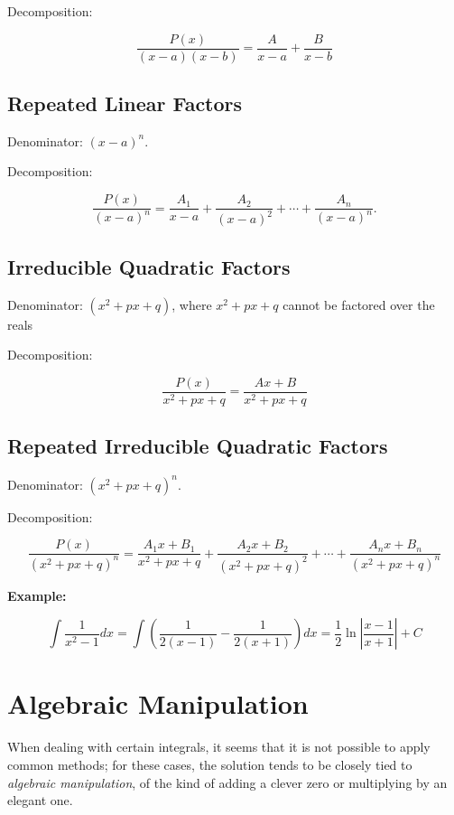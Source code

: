Decomposition: 

\[
    \frac{P(x)}{(x - a)(x - b)} = \frac{A}{x - a} + \frac{B}{x - b}
\]


\subsection{Repeated Linear Factors}
    
Denominator: \((x - a)^n\).

Decomposition: 
   
\[
    \frac{P(x)}{(x - a)^n} = \frac{A_1}{x - a} + \frac{A_2}{(x - a)^2} + \cdots + \frac{A_n}{(x - a)^n}.
\]

\subsection{Irreducible Quadratic Factors}

Denominator: \((x^2 + px + q)\), where \(x^2 + px + q\) cannot be factored over the reals

Decomposition:

\[
    \frac{P(x)}{x^2 + px + q} = \frac{Ax + B}{x^2 + px + q}
\]

\subsection{Repeated Irreducible Quadratic Factors} 

Denominator: \((x^2 + px + q)^n\).

Decomposition:

\[
    \frac{P(x)}{(x^2 + px + q)^n} = \frac{A_1x + B_1}{x^2 + px + q} + \frac{A_2x + B_2}{(x^2 + px + q)^2} + \cdots + \frac{A_nx + B_n}{(x^2 + px + q)^n}
\]


\textbf{Example:}

\[
    \int \frac{1}{x^2 - 1} dx = \int \left( \frac{1}{2(x - 1)} - \frac{1}{2(x + 1)} \right) dx 
    = \frac{1}{2} \ln\left|\frac{x - 1}{x + 1}\right| + C
\]

\section{Algebraic Manipulation}

When dealing with certain integrals, it seems that it is not possible to apply common methods; for these cases, the 
solution tends to be closely tied to \emph{algebraic manipulation}, of the kind of adding a clever zero or multiplying by an
elegant one.

